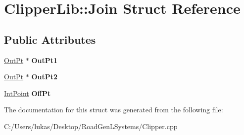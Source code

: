 \hypertarget{struct_clipper_lib_1_1_join}{}\section{Clipper\+Lib\+:\+:Join Struct Reference}
\label{struct_clipper_lib_1_1_join}
\subsection*{Public Attributes}
\begin{DoxyCompactItemize}
\item 
\hypertarget{struct_clipper_lib_1_1_join_a83d7ff096b1cf9425f1c814b7ee5a55d}{}\label{struct_clipper_lib_1_1_join_a83d7ff096b1cf9425f1c814b7ee5a55d} 
\hyperlink{struct_clipper_lib_1_1_out_pt}{Out\+Pt} $\ast$ {\bfseries Out\+Pt1}
\item 
\hypertarget{struct_clipper_lib_1_1_join_a589b2e1162679def2ccd3889306a9230}{}\label{struct_clipper_lib_1_1_join_a589b2e1162679def2ccd3889306a9230} 
\hyperlink{struct_clipper_lib_1_1_out_pt}{Out\+Pt} $\ast$ {\bfseries Out\+Pt2}
\item 
\hypertarget{struct_clipper_lib_1_1_join_afa70561700d774cd762d125f9866327f}{}\label{struct_clipper_lib_1_1_join_afa70561700d774cd762d125f9866327f} 
\hyperlink{struct_clipper_lib_1_1_int_point}{Int\+Point} {\bfseries Off\+Pt}
\end{DoxyCompactItemize}


The documentation for this struct was generated from the following file\+:\begin{DoxyCompactItemize}
\item 
C\+:/\+Users/lukas/\+Desktop/\+Road\+Gen\+L\+Systems/Clipper.\+cpp\end{DoxyCompactItemize}

